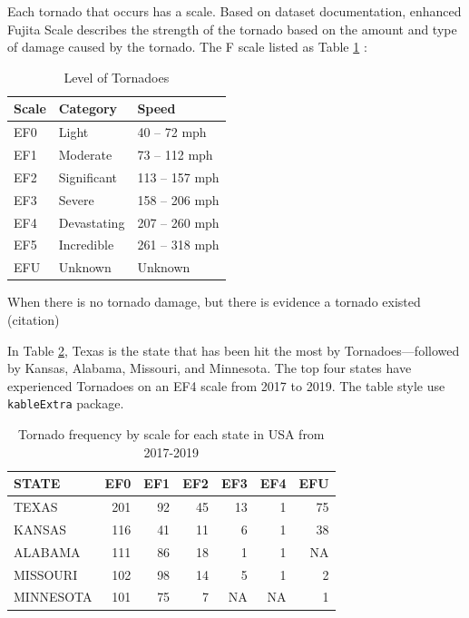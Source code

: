 \documentclass[
]{article}
\begin{document}
Each tornado that occurs has a scale. Based on dataset documentation, enhanced Fujita Scale describes the strength of the tornado based on the amount and type of damage caused by the tornado. \citet{documentation}
The F scale listed as Table \ref{tab:scale} :

\begin{table}[!h]

\caption{\label{tab:scale}Level of Tornadoes}
\centering
\begin{tabular}[t]{l|l|l}
\hline
Scale & Category & Speed\\
\hline
EF0 & Light & 40 – 72 mph\\
\hline
EF1 & Moderate & 73 – 112 mph\\
\hline
EF2 & Significant & 113 – 157 mph\\
\hline
EF3 & Severe & 158 – 206 mph\\
\hline
EF4 & Devastating & 207 – 260 mph\\
\hline
EF5 & Incredible & 261 – 318 mph\\
\hline
EFU & Unknown & Unknown\\
\hline
\end{tabular}
\end{table}

When there is no tornado damage, but there is evidence a tornado existed (citation)

In Table \ref{tab:tornado-state}, Texas is the state that has been hit the most by Tornadoes---followed by Kansas, Alabama, Missouri, and Minnesota. The top four states have experienced Tornadoes on an EF4 scale from 2017 to 2019. The table style use \texttt{kableExtra} package. \citet{kableExtra}

\begin{table}[!h]

\caption{\label{tab:tornado-state}Tornado frequency by scale for each state in USA from 2017-2019}
\centering
\begin{tabular}[t]{l|r|r|r|r|r|r}
\hline
STATE & EF0 & EF1 & EF2 & EF3 & EF4 & EFU\\
\hline
TEXAS & 201 & 92 & 45 & 13 & 1 & 75\\
\hline
KANSAS & 116 & 41 & 11 & 6 & 1 & 38\\
\hline
ALABAMA & 111 & 86 & 18 & 1 & 1 & NA\\
\hline
MISSOURI & 102 & 98 & 14 & 5 & 1 & 2\\
\hline
MINNESOTA & 101 & 75 & 7 & NA & NA & 1\\
\hline
\end{tabular}
\end{table}
\end{document}
